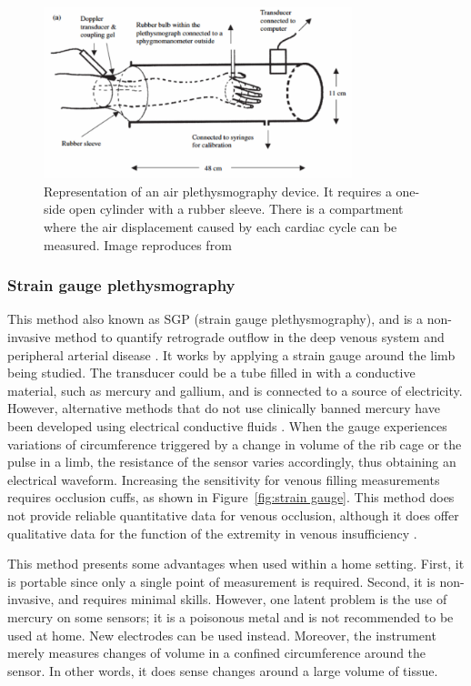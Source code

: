 \begin{figure}[!htpb]
	\centering
	\includegraphics[width=0.8\textwidth,keepaspectratio]{figure4}    
	\caption[Air plethysmography method]{Representation of an air plethysmography device. It requires a one-side open cylinder with a rubber sleeve. There is a compartment where the air displacement caused by each cardiac cycle can be measured. Image reproduces from \cite{chuah2004plethysmography}}
	\label{fig:air plethysmography}
\end{figure}

\subsubsection{Strain gauge plethysmography}
\label{section literature stain grauge}
This method also known as SGP (strain gauge plethysmography), and is a non-invasive method to quantify retrograde outflow in the deep venous system and peripheral arterial disease \cite{holohan1996plethysmography}. It works by applying a strain gauge around the limb being studied. The transducer could be a tube filled in with a conductive material, such as mercury and gallium, and is connected to a source of electricity. However, alternative methods that do not use clinically banned mercury have been developed using electrical conductive fluids \cite{flowers1981strain}. When the gauge experiences variations of circumference triggered by a change in volume of the rib cage or the pulse in a limb, the resistance of the sensor varies accordingly, thus obtaining an electrical waveform. Increasing the sensitivity for venous filling measurements requires occlusion cuffs, as shown in Figure~\ref{fig:strain gauge}. This method does not provide reliable quantitative data for venous occlusion, although it does offer qualitative data for the function of the extremity in venous insufficiency \cite{holohan1996plethysmography}. 

This method presents some advantages when used within a home setting. First, it is portable since only a single point of measurement is required. Second, it is non-invasive, and requires minimal skills. However, one latent problem is the use of mercury on some sensors; it is a poisonous metal and is not recommended to be used at home. New electrodes can be used \cite{flowers1981strain} instead. Moreover, the instrument merely measures changes of volume in a confined circumference around the sensor. In other words, it does sense changes around a large volume of tissue. 

